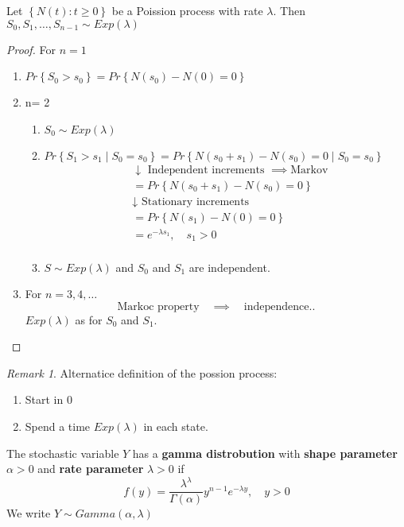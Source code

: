 \documentclass{article}
\theoremstyle{remark}
\newtheorem*{remark}{Remark}
\begin{document}
\begin{theorem}
  Let $\left\{ N\left( t \right): t \ge0 \right\}$ be a Poission process with rate $\lambda $.  Then $S_{0}, S_{1}, \ldots, S_{n-1}\sim Exp\left( \lambda  \right)$
\end{theorem}

\begin{proof}
  For $n = 1$
  \begin{enumerate}[label=(\roman*)]
\item  $\displaystyle  Pr \left \{ S_{0} > s_{0} \right \}  = Pr \left \{   N\left( s_{0} \right) - N\left( 0 \right)    = 0  \right \} $ \[
\]
\item n= 2
\begin{enumerate}[label=(\alph*)]
  \item $S_{0} \sim Exp\left( \lambda  \right)$
  \item $\displaystyle Pr \left \{ S_{1} > s_{1}  \mid  S_{0} = s_{0} \right \}  = Pr \left \{ N\left( s_{0} + s_{1} \right) - N\left( s_{0}  \right) = 0   \mid  S_{0} = s_{0 }\right \} $ \[
      \begin{split}
    &  \downarrow \text{ Independent increments } \implies \text{Markov}  \\
    &= Pr \left \{ N\left( s_{0} +s_{1}  \right) - N\left( s_{0} \right) = 0 \right \}  \\
     &  \downarrow \text{ Stationary increments}  \\
    &= Pr \left \{ N\left( s_{1} \right) - N\left( 0 \right) = 0 \right \}  \\
    &=  e^{-\lambda s_{1}} , \quad  s_{1 } > 0  \\
      \end{split}
  \]
\item $\displaystyle  S\sim Exp\left( \lambda  \right)$ and $S_{0}$ and $S_{1}$ are independent.
\end{enumerate}
\item For $n= 3,4 , \ldots$ \[
\text{Markoc property} \quad  \implies  \quad \text{independence.}  .
\]
$Exp\left( \lambda  \right)$ as for $S_{0}$ and $S_{1}$.
  \end{enumerate}
\end{proof}
\begin{remark}
  Alternatice definition of the possion process:
  \begin{enumerate}[label=(\roman*)]
    \item Start in $0$
    \item Spend a time  $Exp\left( \lambda  \right)$ in each state.
  \end{enumerate}
\end{remark}
\newpage
\begin{definition}
  The stochastic variable $Y$ has a \textbf{gamma distrobution }  with \textbf{shape parameter}  $\alpha > 0 $ and \textbf{rate parameter }  $\lambda > 0$ if \[
  f\left( y \right) = \frac{\lambda ^{\lambda }}{\Gamma \left( \alpha  \right)} y^{n-1} e^{-\lambda  y} , \quad  y> 0
  \]
  We write $Y \sim Gamma\left( \alpha , \lambda  \right)$
\end{definition}
\end{document}
